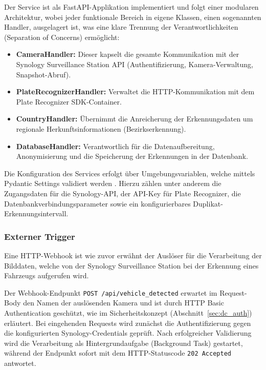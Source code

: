 Der Service ist als FastAPI-Applikation implementiert und folgt einer modularen Architektur, wobei jeder funktionale Bereich in eigene Klassen, einen sogenannten Handler, ausgelagert ist, was eine klare Trennung der Verantwortlichkeiten (Separation of Concerns) ermöglicht:

\begin{itemize}
    \item \textbf{CameraHandler:} Dieser kapselt die gesamte Kommunikation mit der Synology Surveillance Station API (Authentifizierung, Kamera-Verwaltung, Snapshot-Abruf).
    \item \textbf{PlateRecognizerHandler:} Verwaltet die HTTP-Kommunikation mit dem Plate Recognizer SDK-Container.
    \item \textbf{CountryHandler:} Übernimmt die Anreicherung der Erkennungsdaten um regionale Herkunftsinformationen (Bezirkserkennung).
    \item \textbf{DatabaseHandler:} Verantwortlich für die Datenaufbereitung, Anonymisierung und die Speicherung der Erkennungen in der Datenbank.
\end{itemize}

Die Konfiguration des Services erfolgt über Umgebungsvariablen, welche mittels Pydantic Settings validiert werden \cite{pydantic_settings}.
Hierzu zählen unter anderem die Zugangsdaten für die Synology-API, der API-Key für Plate Recognizer, die Datenbankverbindungsparameter sowie ein konfigurierbares Duplikat-Erkennungsintervall.


\subsubsection{Externer Trigger}
\label{sec:externer_trigger}

Eine HTTP-Webhook ist wie zuvor erwähnt der Auslöser für die Verarbeitung der Bilddaten, welche von der Synology Surveillance Station bei der Erkennung eines Fahrzeugs aufgerufen wird. \cite{synology_webhooks}

Der Webhook-Endpunkt \texttt{POST /api/vehicle\_detected} erwartet im Request-Body den Namen der auslösenden Kamera und ist durch HTTP Basic Authentication geschützt, wie im Sicherheitskonzept (Abschnitt~\ref{sec:dc_auth}) erläutert.
Bei eingehenden Requests wird zunächst die Authentifizierung gegen die konfigurierten Synology-Credentials geprüft.
Nach erfolgreicher Validierung wird die Verarbeitung als Hintergrundaufgabe (Background Task) gestartet, während der Endpunkt sofort mit dem HTTP-Statuscode \texttt{202 Accepted} antwortet.

